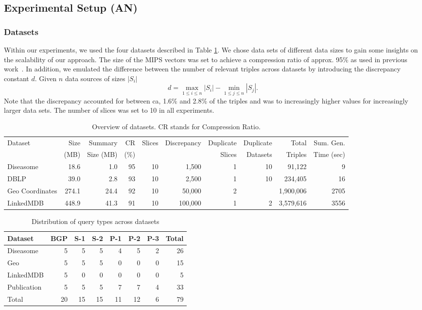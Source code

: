 \documentclass{sig-alternate}  %
\begin{document}
\subsection{Experimental Setup (AN)}
\subsubsection{Datasets}
Within our experiments, we used the four datasets described in Table \ref{tab:datasets}.
We chose data sets of different data sizes to gain some insights on the scalability of our approach.
The size of the MIPS vectors was set to achieve a compression ratio of approx. 95\% as used in previous work~\cite{QTREE}.
In addition, we emulated the difference between the number of relevant triples across datasets by introducing the discrepancy constant $d$.
Given $n$ data sources of sizes $|S_i|$
\begin{equation}
d = \max\limits_{1 \leq i \leq n} |S_i| - \min\limits_{1 \leq j \leq n} |S_j|.
\end{equation}
Note that the discrepancy accounted for between ca, 1.6\% and 2.8\% of the triples and was to increasingly higher values for increasingly larger data sets.
The number of slices was set to 10 in all experiments.
\begin{table}
\centering
\begin{tabular}{lrrrrrrrrr}
\hline
Dataset & Size  & Summary 	& CR   & Slices & Discrepancy & Duplicate  & Duplicate & Total 	& Sum. Gen. \\
				& (MB) 	& Size (MB) & (\%) &	  		 &  					 & Slices 		& Datasets 	& Triples & Time (sec)\\
\hline
Diseasome 			& 18.6 	& 1.0 	& 95 & 10 & 1,500 		& 1 & 10 			& 91,122 & 9\\
DBLP 						& 39.0	& 2.8 	& 93 & 10 & 2,500 		& 1 & 10 			& 234,405 & 16\\
Geo Coordinates & 274.1 & 24.4 	& 92 & 10 & 50,000 	& 2 & 				& 1,900,006 & 2705\\
LinkedMDB 			& 448.9 & 41.3 	& 91 & 10 & 100,000 	& 1 & 2 			& 3,579,616 & 3556\\
\hline
\end{tabular}
\caption{Overview of datasets. CR stands for Compression Ratio.}
\label{tab:datasets}
\end{table}

\begin{table}
\centering
\begin{tabular}{lrrrrrrr}
\hline
Dataset 		& BGP  & S-1 & S-2 & P-1 & P-2 & P-3 & Total \\\hline
Diseasome 			& 5 & 5 & 5 & 4 & 5 & 2 & 26 \\
Geo  & 5 & 5 & 5 & 0 & 0 & 0 & 15 \\
LinkedMDB 			& 5 & 0 & 0 & 0 & 0 & 0 & 5 \\
Publication 		& 5 & 5 & 5 & 7 & 7 & 4 & 33 \\\hline
Total 					& 20 & 15 & 15 & 11 & 12 & 6 & 79\\
\hline
\end{tabular}
\caption{Distribution of query types across datasets}
\label{tab:queries}
\end{table}
\end{document}
